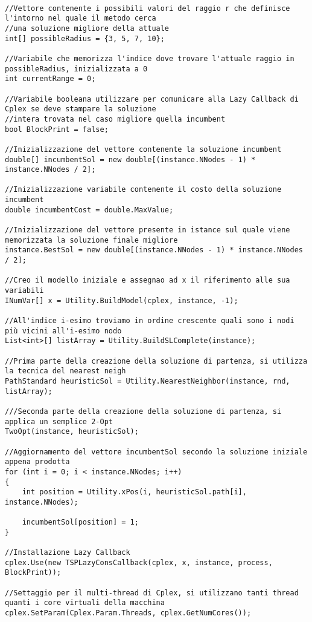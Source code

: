 \documentclass[11pt]{article}
\begin{document}
\begin{lstlisting}

//Vettore contenente i possibili valori del raggio r che definisce l'intorno nel quale il metodo cerca
//una soluzione migliore della attuale
int[] possibleRadius = {3, 5, 7, 10};

//Variabile che memorizza l'indice dove trovare l'attuale raggio in possibleRadius, inizializzata a 0
int currentRange = 0;

//Variabile booleana utilizzare per comunicare alla Lazy Callback di Cplex se deve stampare la soluzione
//intera trovata nel caso migliore quella incumbent
bool BlockPrint = false;

//Inizializzazione del vettore contenente la soluzione incumbent
double[] incumbentSol = new double[(instance.NNodes - 1) * instance.NNodes / 2];

//Inizializzazione variabile contenente il costo della soluzione incumbent
double incumbentCost = double.MaxValue;

//Inizializzazione del vettore presente in istance sul quale viene memorizzata la soluzione finale migliore
instance.BestSol = new double[(instance.NNodes - 1) * instance.NNodes / 2];

//Creo il modello iniziale e assegnao ad x il riferimento alle sua variabili
INumVar[] x = Utility.BuildModel(cplex, instance, -1);

//All'indice i-esimo troviamo in ordine crescente quali sono i nodi più vicini all'i-esimo nodo
List<int>[] listArray = Utility.BuildSLComplete(instance);

//Prima parte della creazione della soluzione di partenza, si utilizza la tecnica del nearest neigh
PathStandard heuristicSol = Utility.NearestNeighbor(instance, rnd, listArray);

///Seconda parte della creazione della soluzione di partenza, si applica un semplice 2-Opt
TwoOpt(instance, heuristicSol);

//Aggiornamento del vettore incumbentSol secondo la soluzione iniziale appena prodotta
for (int i = 0; i < instance.NNodes; i++)
{
    int position = Utility.xPos(i, heuristicSol.path[i], instance.NNodes);

    incumbentSol[position] = 1;
}

//Installazione Lazy Callback
cplex.Use(new TSPLazyConsCallback(cplex, x, instance, process, BlockPrint));

//Settaggio per il multi-thread di Cplex, si utilizzano tanti thread quanti i core virtuali della macchina
cplex.SetParam(Cplex.Param.Threads, cplex.GetNumCores());


\end{lstlisting}
\end{document}
